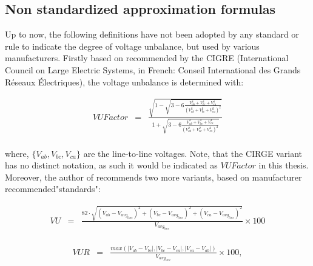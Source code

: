 	\subsection{Non standardized approximation formulas}\label{BASICUNB:sec:ApproxFormula}
	
	Up to now, the following definitions have not been adopted by any standard or rule to indicate the degree of voltage unbalance, but used by various manufacturers. Firstly based on \cite{eugene1986new} recommended by the CIGRE (International Council on Large Electric Systems, in French: Conseil International des Grands Réseaux Électriques), the voltage unbalance is determined with:
	
	\begin{equation}
        \begin{array}{rcl}
            VUFactor&=&\frac{\sqrt{{1-\sqrt{3-6\frac{V_{ab}^4+V_{bc}^4+V_{ca}^4}{\left(V_{ab}^2+V_{bc}^2+V_{ca}^2\right)^2}}}}}{1+\sqrt{3-6\frac{V_{ab}^4+V_{bc}^4+V_{ca}^4}{\left(V_{ab}^2+V_{bc}^2+V_{ca}^2\right)^2}}}\\
        \end{array}
        \label{BASICUNB:equ:CIRGE}
    \end{equation}
		
		where, $\{V_{ab},V_{bc},V_{ca}\}$ are the line-to-line voltages. Note, that the CIRGE variant has no distinct notation, as such it would be indicated as $VUFactor$ in this thesis. Moreover, the author of \cite{robert1992assessing} recommends two more variants, based on manufacturer recommended"standards":
		
		\begin{equation}
        \begin{array}{rcl}
            VU&=&\frac{82\cdot\sqrt{(V_{ab}-V_{avg_{line}})^2+(V_{bc}-V_{avg_{line}})^2+(V_{ca}-V_{avg_{line}})^2}}{V_{avg_{line}}}\times100\\					
        \end{array}
        \label{BASICUNB:equ:VU}
    \end{equation}
		
		\begin{equation}
        \begin{array}{rcl}
            VUR&=&\frac{max\left( |V_{ab}-V_{bc}|,|V_{bc}-V_{ca}|,|V_{ca}-V_{ab}| \right)}{V_{avg_{line}}}\times100,\\				
        \end{array}
        \label{BASICUNB:equ:VUR}
    \end{equation}
		

